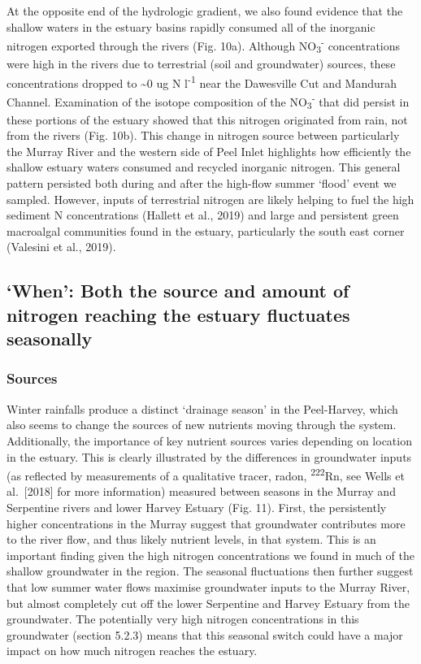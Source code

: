 \documentclass[
]{book}
\begin{document}
At the opposite end of the hydrologic gradient, we also found evidence that the shallow waters in the estuary basins rapidly consumed all of the inorganic nitrogen exported through the rivers (Fig. 10a). Although NO\textsubscript{3}\textsuperscript{-} concentrations were high in the rivers due to terrestrial (soil and groundwater) sources, these concentrations dropped to \textasciitilde0 ug N l\textsuperscript{-1} near the Dawesville Cut and Mandurah Channel. Examination of the isotope composition of the NO\textsubscript{3}\textsuperscript{-} that did persist in these portions of the estuary showed that this nitrogen originated from rain, not from the rivers (Fig. 10b). This change in nitrogen source between particularly the Murray River and the western side of Peel Inlet highlights how efficiently the shallow estuary waters consumed and recycled inorganic nitrogen. This general pattern persisted both during and after the high-flow summer `flood' event we sampled. However, inputs of terrestrial nitrogen are likely helping to fuel the high sediment N concentrations (Hallett et al., 2019) and large and persistent green macroalgal communities found in the estuary, particularly the south east corner (Valesini et al., 2019).

\hypertarget{when-both-the-source-and-amount-of-nitrogen-reaching-the-estuary-fluctuates-seasonally}{%
\subsection{`When': Both the source and amount of nitrogen reaching the estuary fluctuates seasonally}\label{when-both-the-source-and-amount-of-nitrogen-reaching-the-estuary-fluctuates-seasonally}}

\hypertarget{sources-1}{%
\subsubsection{Sources}\label{sources-1}}

Winter rainfalls produce a distinct `drainage season' in the Peel-Harvey, which also seems to change the sources of new nutrients moving through the system. Additionally, the importance of key nutrient sources varies depending on location in the estuary. This is clearly illustrated by the differences in groundwater inputs (as reflected by measurements of a qualitative tracer, radon, \textsuperscript{222}Rn, see Wells et al.~{[}2018{]} for more information) measured between seasons in the Murray and Serpentine rivers and lower Harvey Estuary (Fig. 11). First, the persistently higher concentrations in the Murray suggest that groundwater contributes more to the river flow, and thus likely nutrient levels, in that system. This is an important finding given the high nitrogen concentrations we found in much of the shallow groundwater in the region. The seasonal fluctuations then further suggest that low summer water flows maximise groundwater inputs to the Murray River, but almost completely cut off the lower Serpentine and Harvey Estuary from the groundwater. The potentially very high nitrogen concentrations in this groundwater (section 5.2.3) means that this seasonal switch could have a major impact on how much nitrogen reaches the estuary.~
\end{document}
